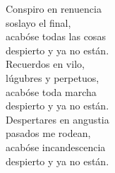 \newenvironment{dedication}{
\thispagestyle{empty}
\vspace*{3.3\baselineskip}
}{\clearpage}

\begin{dedication}
\noindent Conspiro en renuencia\\
soslayo el final,\\
acabóse todas las cosas\\
despierto y ya no están.\\

\noindent Recuerdos en vilo,\\
lúgubres y perpetuos,\\
acabóse toda marcha\\
despierto y ya no están.\\

\noindent Despertares en angustia\\
pasados me rodean,\\
acabóse incandescencia\\
despierto y ya no están.\\
\end{dedication}
